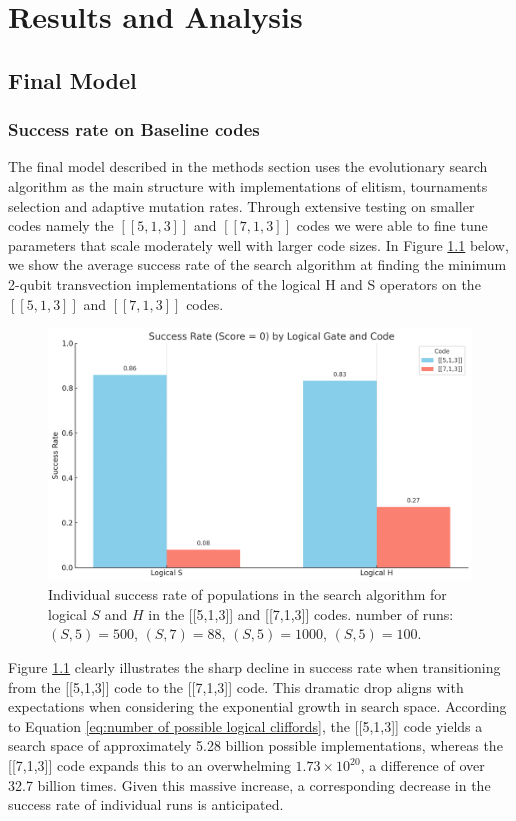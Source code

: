 \chapter{Results and Analysis} \label{Chap4}

\section{Final Model}

\subsection{Success rate on Baseline codes}
The final model described in the methods section uses the evolutionary search algorithm as the main structure with implementations of elitism, tournaments selection and adaptive mutation rates. Through extensive testing on smaller codes namely the \([[5,1,3]]\) and \([[7,1,3]]\) codes we were able to fine tune parameters that scale moderately well with larger code sizes. In Figure \ref{fig:Final model success rate} below, we show the average success rate of the search algorithm at finding the minimum 2-qubit transvection implementations of the logical H and S operators on the \([[5,1,3]]\) and \([[7,1,3]]\) codes.

\begin{figure}[H]
    \centering
    \includegraphics[width=1\linewidth]{Logos/output-6.png}
    \caption{Individual success rate of populations in the search algorithm for logical \(S\) and \(H\) in the [[5,1,3]] and [[7,1,3]] codes. number of runs: \((S,5)=500\), \((S,7)=88\), \((S,5)=1000\), \((S,5)=100\).}
    \label{fig:Final model success rate}
\end{figure}

Figure \ref{fig:Final model success rate} clearly illustrates the sharp decline in success rate when transitioning from the [[5,1,3]] code to the [[7,1,3]] code. This dramatic drop aligns with expectations when considering the exponential growth in search space. According to Equation \ref{eq:number of possible logical cliffords}, the [[5,1,3]] code yields a search space of approximately 5.28 billion possible implementations, whereas the [[7,1,3]] code expands this to an overwhelming \(1.73\times 10^{20}\), a difference of over 32.7 billion times. Given this massive increase, a corresponding decrease in the success rate of individual runs is anticipated.

